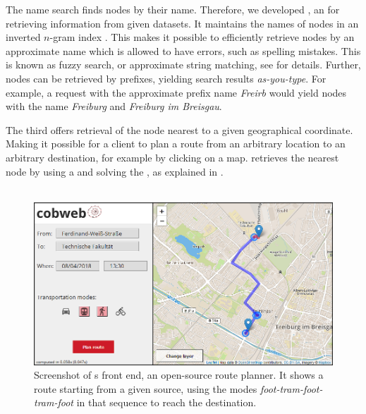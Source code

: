 	The name search \api finds \osm nodes by their name. Therefore, we developed \lexiSearch {}, an \api for retrieving
	information from given datasets.
	It maintains the names of \osm nodes in an inverted $n$-gram index . This makes it possible to efficiently
	retrieve nodes by an approximate name which is allowed to have errors, such as spelling mistakes. This is known as fuzzy search, or
	approximate string matching, see  for details. Further, nodes can be retrieved by prefixes, yielding search
	results \textit{as-you-type}. For example, a request with the approximate prefix name \textit{Freirb} would yield nodes with
	the name \textit{Freiburg} and \textit{Freiburg im Breisgau}.
	
	The third \api offers retrieval of the \osm node nearest to a given geographical coordinate. Making it possible for a client to plan a
	route from an arbitrary location to an arbitrary destination, for example by clicking on a map. \cobweb retrieves the nearest node by
	using a \coverTree and solving the \nearestNeighborProblem, as explained in .\\\\
	\begin{figure}[!ht]
		 \begin{center}
			\includegraphics[scale=0.5]{res/cobweb_frontend}
		\end{center}
		\caption{Screenshot of {\cobweb}s  front end, an open-source \multiModal route planner. It shows a \multiModal
		route starting from a given source, using the modes \textit{foot-tram-foot-tram-foot} in that sequence to reach the destination.}
		\label{cobweb_frontend}
	\end{figure}\quad\\
